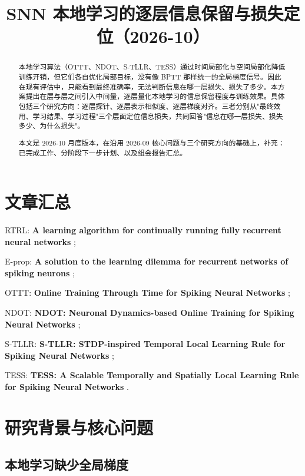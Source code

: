 \documentclass[journal,12pt,onecolumn]{IEEEtran}
\begin{document}
\title{SNN 本地学习的逐层信息保留与损失定位（2026-10）}

\author{}
\date{}

\maketitle

\begin{abstract}
本地学习算法（OTTT、NDOT、S-TLLR、TESS）通过时间局部化与空间局部化降低训练开销，但它们各自优化局部目标，没有像 BPTT 那样统一的全局梯度信号。因此在现有评估中，只能看到最终准确率，无法判断信息在哪一层损失、损失了多少。本方案提出在层与层之间引入中间量，逐层量化本地学习的信息保留程度与训练效果。具体包括三个研究方向：逐层探针、逐层表示相似度、逐层梯度对齐。三者分别从"最终效用、学习结果、学习过程"三个层面定位信息损失，共同回答"信息在哪一层损失、损失多少、为什么损失"。

本文是 2026-10 月度版本，在沿用 2026-09 核心问题与三个研究方向的基础上，补充：已完成工作、分阶段下一步计划、以及组会报告汇总。
\end{abstract}

\section*{文章汇总}

RTRL: \textbf{A learning algorithm for continually running fully recurrent neural networks} \cite{williams1989learning};

E-prop: \textbf{A solution to the learning dilemma for recurrent networks of spiking neurons} \cite{bellec_solution_2020};

OTTT: \textbf{Online Training Through Time for Spiking Neural Networks} \cite{xiao_online_2022};

NDOT: \textbf{NDOT: Neuronal Dynamics-based Online Training for Spiking Neural Networks} \cite{jiang_ndot_nodate};

S-TLLR: \textbf{S-TLLR: STDP-inspired Temporal Local Learning Rule for Spiking Neural Networks} \cite{apolinario_s-tllr_2024};

TESS: \textbf{TESS: A Scalable Temporally and Spatially Local Learning Rule for Spiking Neural Networks} \cite{apolinario_tess_2025}.

\section{研究背景与核心问题}

\subsection{本地学习缺少全局梯度}
\end{document}
